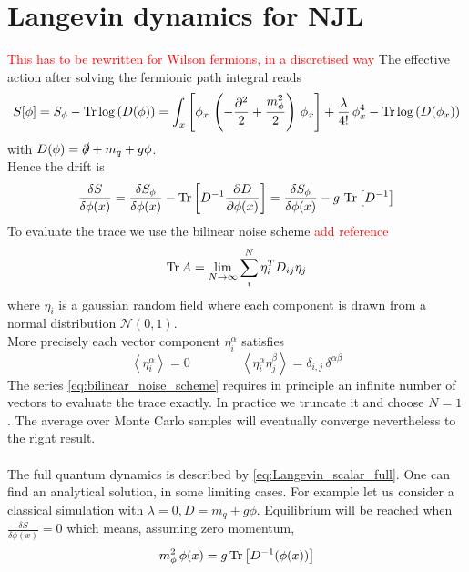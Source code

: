 \section{Langevin dynamics for NJL}
\textcolor{red}{This has to be rewritten for Wilson fermions, in a discretised way}
The effective action after solving the fermionic path integral reads
\begin{equation*}
    S[\phi] = S_\phi - \text{Tr} \log\left(D(\phi)\right) = \int_x \left[ \phi_x \, \left(-\frac{\partial ^2}{2} + \frac{m_\phi^2}{2}\right) \, \phi_x \right]+ \frac{\lambda}{4!} \, \phi_x^4 - \text{Tr} \log\left(D(\phi_x)\right)
\end{equation*}
with $D(\phi) = \slashed{\partial} + m_q + g\phi$. \\
Hence the drift is 
\begin{equation*}
    \frac{\delta S}{\delta \phi(x)} = \frac{\delta S_\phi}{\delta \phi(x)} - \operatorname{\text{Tr}} \left[D^{-1} \frac{\partial D}{\partial \phi(x)}\right] = \frac{\delta S_\phi}{\delta \phi(x)} - g \, \operatorname{\text{Tr}} \left[D^{-1}\right]
\end{equation*}
To evaluate the trace we use the bilinear noise scheme \textcolor{red}{add reference} 
\begin{equation}
    \operatorname{\text{Tr}} {A} = \lim_{N \to \infty} \sum_i^N \eta_i^T D_{ij} \eta_j
    \label{eq:bilinear_noise_scheme}
\end{equation}
where $\eta_i$ is a gaussian random field where each component is drawn from a normal distribution $\mathcal{N}(0,1)$. \\
More precisely each vector component $\eta_i^\alpha$ satisfies
\begin{equation*}
    \left\langle \eta_i^{\alpha} \right\rangle = 0 \qquad\qquad \left\langle \eta_i^{\alpha}\eta_j^{\beta} \right\rangle = \delta_{i,j} \, \delta^{\alpha \beta}
\end{equation*}
The series \eqref{eq:bilinear_noise_scheme} requires in principle an infinite number of vectors to evaluate the trace exactly. In practice we truncate it and choose $N=1$ . The average over Monte Carlo samples will eventually converge nevertheless to the right result. \\~\\
The full quantum dynamics is described by \eqref{eq:Langevin_scalar_full}. One can find an analytical solution, in some limiting cases. For example let us consider a classical simulation with $\lambda = 0, D = m_q + g\phi$. Equilibrium will be reached when $\frac{\delta S}{\delta \phi(x)} = 0$ which means, assuming zero momentum,
\begin{equation*}
    m_\phi^2 \, \phi(x) = g \operatorname{\text{Tr}} \left[D^{-1}(\phi(x))\right]
\end{equation*}
